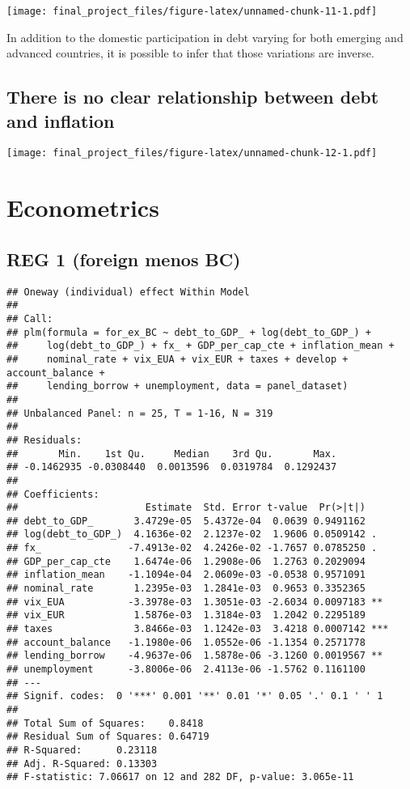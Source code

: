 \documentclass[]{article}
\begin{document}
\texttt{[image: final\_project\_files/figure-latex/unnamed-chunk-11-1.pdf]}

In addition to the domestic participation in debt varying for both
emerging and advanced countries, it is possible to infer that those
variations are inverse.

\subsection{There is no clear relationship between debt and
inflation}\label{there-is-no-clear-relationship-between-debt-and-inflation}

\texttt{[image: final\_project\_files/figure-latex/unnamed-chunk-12-1.pdf]}

\section{Econometrics}\label{econometrics}

\subsection{REG 1 (foreign menos BC)}\label{reg-1-foreign-menos-bc}

\begin{verbatim}
## Oneway (individual) effect Within Model
## 
## Call:
## plm(formula = for_ex_BC ~ debt_to_GDP_ + log(debt_to_GDP_) + 
##     log(debt_to_GDP_) + fx_ + GDP_per_cap_cte + inflation_mean + 
##     nominal_rate + vix_EUA + vix_EUR + taxes + develop + account_balance + 
##     lending_borrow + unemployment, data = panel_dataset)
## 
## Unbalanced Panel: n = 25, T = 1-16, N = 319
## 
## Residuals:
##       Min.    1st Qu.     Median    3rd Qu.       Max. 
## -0.1462935 -0.0308440  0.0013596  0.0319784  0.1292437 
## 
## Coefficients:
##                      Estimate  Std. Error t-value  Pr(>|t|)    
## debt_to_GDP_       3.4729e-05  5.4372e-04  0.0639 0.9491162    
## log(debt_to_GDP_)  4.1636e-02  2.1237e-02  1.9606 0.0509142 .  
## fx_               -7.4913e-02  4.2426e-02 -1.7657 0.0785250 .  
## GDP_per_cap_cte    1.6474e-06  1.2908e-06  1.2763 0.2029094    
## inflation_mean    -1.1094e-04  2.0609e-03 -0.0538 0.9571091    
## nominal_rate       1.2395e-03  1.2841e-03  0.9653 0.3352365    
## vix_EUA           -3.3978e-03  1.3051e-03 -2.6034 0.0097183 ** 
## vix_EUR            1.5876e-03  1.3184e-03  1.2042 0.2295189    
## taxes              3.8466e-03  1.1242e-03  3.4218 0.0007142 ***
## account_balance   -1.1980e-06  1.0552e-06 -1.1354 0.2571778    
## lending_borrow    -4.9637e-06  1.5878e-06 -3.1260 0.0019567 ** 
## unemployment      -3.8006e-06  2.4113e-06 -1.5762 0.1161100    
## ---
## Signif. codes:  0 '***' 0.001 '**' 0.01 '*' 0.05 '.' 0.1 ' ' 1
## 
## Total Sum of Squares:    0.8418
## Residual Sum of Squares: 0.64719
## R-Squared:      0.23118
## Adj. R-Squared: 0.13303
## F-statistic: 7.06617 on 12 and 282 DF, p-value: 3.065e-11
\end{verbatim}
\end{document}
